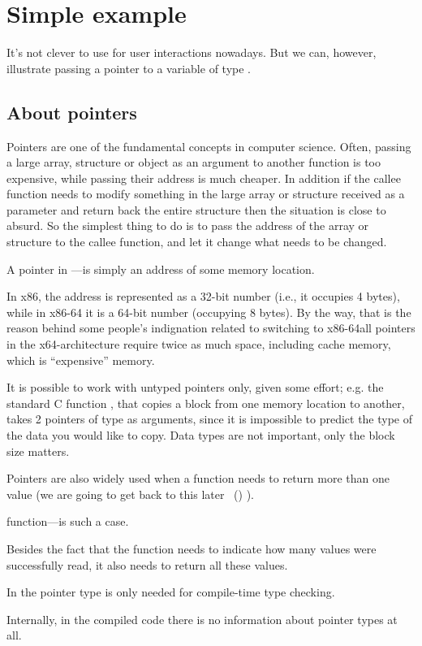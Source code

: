 \section{Simple example}



It's not clever to use \scanf for user interactions nowadays. 
But we can, however, illustrate passing a pointer to a variable of type \Tint.

\subsection{About pointers}
\myindex{\CLanguageElements!\Pointers}

Pointers are one of the fundamental concepts in computer science.
Often, passing a large array, structure or object as an argument to another function is too expensive, while passing their address is much cheaper.
In addition if the \gls{callee} function needs to modify something in the large array or structure received as a parameter and return back the entire structure then the situation is close to absurd.
So the simplest thing to do is to pass the address of the array or structure to the \gls{callee} function, and let it change what needs to be changed.

A pointer in \CCpp---is simply an address of some memory location.

In x86, the address is represented as a 32-bit number (i.e., it occupies 4 bytes), while in x86-64 it is a 64-bit number (occupying 8 bytes).
By the way, that is the reason behind some people's indignation related to switching to x86-64\EMDASH{}all pointers in the x64-architecture require twice as much space, including cache memory, which is ``expensive'' memory.

It is possible to work with untyped pointers only, given some effort; e.g. the standard C function , that copies a block from one memory location to another,
takes 2 pointers of type  as arguments, since it is impossible to predict the type of the data you would like to copy. Data types are not important, only the block size matters.

Pointers are also widely used when a function needs to return more than one value
(we are going to get back to this later
~()
).

 function---is such a case.

Besides the fact that the function needs to indicate how many values were successfully read, it also needs to return all these values.

In \CCpp the pointer type is only needed for compile-time type checking.

Internally, in the compiled code there is no information about pointer types at all.




\ifdefined\IncludeARM

\fi
\ifdefined\IncludeMIPS

\fi
